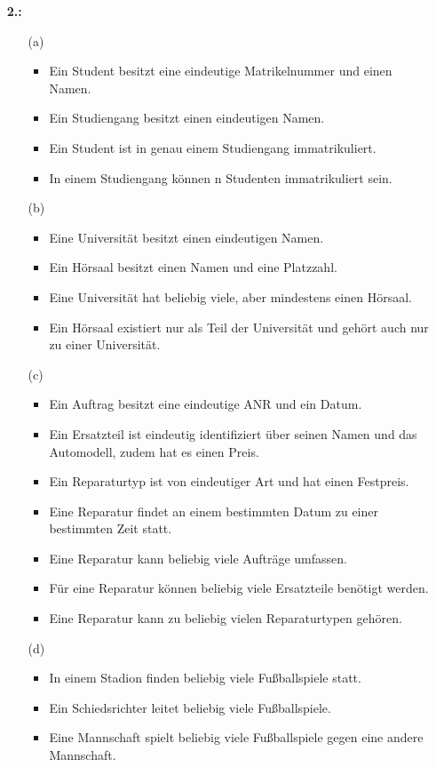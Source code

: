 \documentclass[a4paper,11pt,fleqn]{scrartcl}
\begin{document}
\begin{enumerate}
	\item[\textbf{2.:}]
	\begin{enumerate}
		\item[(a)]
			\begin{itemize}
				\item Ein Student besitzt eine eindeutige Matrikelnummer und einen Namen.
				\item Ein Studiengang besitzt einen eindeutigen Namen.
				\item Ein Student ist in genau einem Studiengang immatrikuliert.
				\item In einem Studiengang können n Studenten immatrikuliert sein.
			\end{itemize} \quad

		\item[(b)]
			\begin{itemize}
				\item Eine Universität besitzt einen eindeutigen Namen.
				\item Ein Hörsaal besitzt einen Namen und eine Platzzahl.
				\item Eine Universität hat beliebig viele, aber mindestens einen Hörsaal.
				\item Ein Hörsaal existiert nur als Teil der Universität und gehört auch nur zu einer Universität.
			\end{itemize} \quad

		\item[(c)]
			\begin{itemize}
				\item Ein Auftrag besitzt eine eindeutige ANR und ein Datum.
				\item Ein Ersatzteil ist eindeutig identifiziert über seinen Namen und das Automodell, zudem hat es einen Preis.
				\item Ein Reparaturtyp ist von eindeutiger Art und hat einen Festpreis.
				\item Eine Reparatur findet an einem bestimmten Datum zu einer bestimmten Zeit statt.
				\item Eine Reparatur kann beliebig viele Aufträge umfassen.
				\item Für eine Reparatur können beliebig viele Ersatzteile benötigt werden.
				\item Eine Reparatur kann zu beliebig vielen Reparaturtypen gehören.
			\end{itemize} \quad

		\item[(d)]
			\begin{itemize}
				\item In einem Stadion finden beliebig viele Fußballspiele statt.
				\item Ein Schiedsrichter leitet beliebig viele Fußballspiele.
				\item Eine Mannschaft spielt beliebig viele Fußballspiele gegen eine andere Mannschaft.
			\end{itemize} \quad 
	\end{enumerate}


\end{enumerate}
\end{document}
